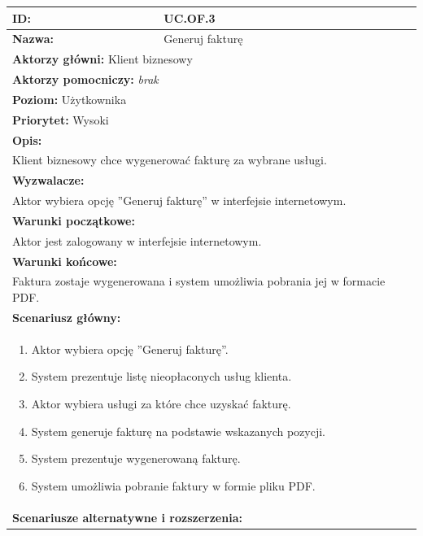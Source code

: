 \begin{center}
\begin{longtable}[h]{|p{1.6cm}|p{13.5cm}|}
\hline
\textbf{ID:} & UC.OF.3 \\ \hline
\textbf{Nazwa:} & Generuj fakturę \\ \hline
\multicolumn{2}{|p{15.1cm}|}{\textbf{Aktorzy główni:} Klient biznesowy} \\
\multicolumn{2}{|p{15.1cm}|}{\textbf{Aktorzy pomocniczy:} 
\textit{brak}} \\
\multicolumn{2}{|p{15.1cm}|}{\textbf{Poziom:} Użytkownika} \\
\multicolumn{2}{|p{15.1cm}|}{\textbf{Priorytet:} Wysoki} \\
\hline
\multicolumn{2}{|p{15.1cm}|}{\textbf{Opis:}} \\
\multicolumn{2}{|p{15.1cm}|}{
Klient biznesowy chce wygenerować fakturę za wybrane usługi.
} \\ \hline
\multicolumn{2}{|p{15.1cm}|}{\textbf{Wyzwalacze:}} \\
\multicolumn{2}{|p{15.1cm}|}{
Aktor wybiera opcję ''Generuj fakturę'' w interfejsie internetowym.
} \\ \hline
\multicolumn{2}{|p{15.1cm}|}{\textbf{Warunki początkowe:}} \\
\multicolumn{2}{|p{15.1cm}|}{
Aktor jest zalogowany w interfejsie internetowym.
} \\ \hline
\multicolumn{2}{|p{15.1cm}|}{\textbf{Warunki końcowe:}} \\
\multicolumn{2}{|p{15.1cm}|}{
Faktura zostaje wygenerowana i system umożliwia pobrania jej w formacie PDF.
} \\ \hline
\multicolumn{2}{|p{15.1cm}|}{\textbf{Scenariusz główny:}} \\
\multicolumn{2}{|p{15.1cm}|}{
\begin{enumerate}
\item Aktor wybiera opcję ''Generuj fakturę''.
\item System prezentuje listę nieopłaconych usług klienta.
\item Aktor wybiera usługi za które chce uzyskać fakturę.
\item System generuje fakturę na podstawie wskazanych pozycji.
\item System prezentuje wygenerowaną fakturę.
\item System umożliwia pobranie faktury w formie pliku PDF.
\end{enumerate}
} \\ \hline
\multicolumn{2}{|p{15.1cm}|}{\textbf{Scenariusze alternatywne i rozszerzenia:}} \\

\end{longtable}
\end{center}
